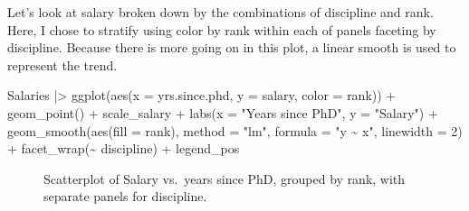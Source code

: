 \documentclass[
  letterpaper,
  10pt,
  krantz2]{krantz}
\makeatletter
\newenvironment{Shaded}{\begin{snugshade}}{\end{snugshade}}
\newcommand{\AttributeTok}[1]{\textcolor[rgb]{0.40,0.45,0.13}{#1}}
\newcommand{\DecValTok}[1]{\textcolor[rgb]{0.68,0.00,0.00}{#1}}
\newcommand{\FunctionTok}[1]{\textcolor[rgb]{0.28,0.35,0.67}{#1}}
\newcommand{\NormalTok}[1]{\textcolor[rgb]{0.00,0.23,0.31}{#1}}
\newcommand{\SpecialCharTok}[1]{\textcolor[rgb]{0.37,0.37,0.37}{#1}}
\newcommand{\StringTok}[1]{\textcolor[rgb]{0.13,0.47,0.30}{#1}}
\newenvironment{kframe}{%
  \medskip{}
  \setlength{\fboxsep}{.8em}
  \def\at@end@of@kframe{}%
  \ifinner\ifhmode%
  \def\at@end@of@kframe{\end{minipage}}%
  \begin{minipage}{\columnwidth}%
  \fi\fi%
  \def\FrameCommand##1{\hskip\@totalleftmargin \hskip-\fboxsep
  \colorbox{shadecolor}{##1}\hskip-\fboxsep
      \hskip-\linewidth \hskip-\@totalleftmargin \hskip\columnwidth}%
  \MakeFramed {\advance\hsize-\width
    \@totalleftmargin\z@ \linewidth\hsize
    \@setminipage}}%
{\par\unskip\endMakeFramed%
  \at@end@of@kframe}
\renewenvironment{Shaded}{\begin{kframe}}{\end{kframe}}
\makeatother
\begin{document}
Let's look at salary broken down by the combinations of discipline and
rank. Here, I chose to stratify using color by rank within each of
panels faceting by discipline. Because there is more going on in this
plot, a linear smooth is used to represent the trend.

\begin{Shaded}
\begin{Highlighting}[]
\NormalTok{Salaries }\SpecialCharTok{|\textgreater{}}
  \FunctionTok{ggplot}\NormalTok{(}\FunctionTok{aes}\NormalTok{(}\AttributeTok{x =}\NormalTok{ yrs.since.phd, }\AttributeTok{y =}\NormalTok{ salary, }\AttributeTok{color =}\NormalTok{ rank)) }\SpecialCharTok{+}
  \FunctionTok{geom\_point}\NormalTok{() }\SpecialCharTok{+}
\NormalTok{  scale\_salary }\SpecialCharTok{+}
  \FunctionTok{labs}\NormalTok{(}\AttributeTok{x =} \StringTok{"Years since PhD"}\NormalTok{,}
       \AttributeTok{y =} \StringTok{"Salary"}\NormalTok{) }\SpecialCharTok{+}
  \FunctionTok{geom\_smooth}\NormalTok{(}\FunctionTok{aes}\NormalTok{(}\AttributeTok{fill =}\NormalTok{ rank),}
              \AttributeTok{method =} \StringTok{"lm"}\NormalTok{, }\AttributeTok{formula =} \StringTok{"y \textasciitilde{} x"}\NormalTok{, }
              \AttributeTok{linewidth =} \DecValTok{2}\NormalTok{) }\SpecialCharTok{+}
  \FunctionTok{facet\_wrap}\NormalTok{(}\SpecialCharTok{\textasciitilde{}}\NormalTok{ discipline) }\SpecialCharTok{+}
\NormalTok{  legend\_pos}
\end{Highlighting}
\end{Shaded}

\begin{figure}[H]


\caption{\label{fig-Salaries-faceted}Scatterplot of Salary vs.~years
since PhD, grouped by rank, with separate panels for discipline.}

\end{figure}%
\end{document}
